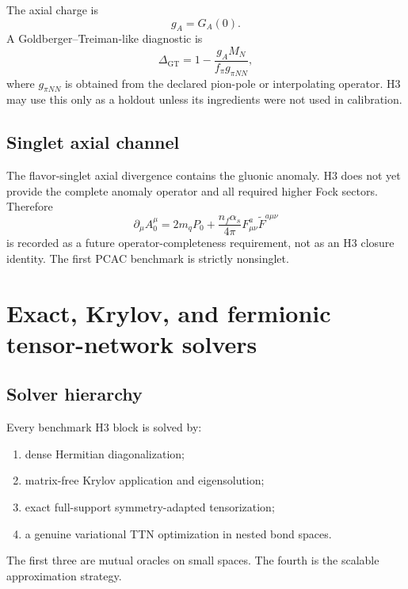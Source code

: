 \documentclass[11pt]{article}
\begin{document}
The axial charge is
\begin{equation}
 g_A=G_A(0).
\end{equation}
A Goldberger--Treiman-like diagnostic is
\cite{GoldbergerTreiman1958}
\begin{equation}
 \Delta_{\mathrm{GT}}
 =1-
 \frac{g_A M_N}{f_{\pi}g_{\pi NN}},
 \label{eq:gt-discrepancy}
\end{equation}
where \(g_{\pi NN}\) is obtained from the declared pion-pole or interpolating
operator.  H3 may use this only as a holdout unless its ingredients were not
used in calibration.

\subsection{Singlet axial channel}

The flavor-singlet axial divergence contains the gluonic anomaly.  H3 does
not yet provide the complete anomaly operator and all required higher Fock
sectors.  Therefore
\begin{equation}
 \partial_{\mu}A_0^{\mu}
 =2m_qP_0+\frac{n_f\alpha_s}{4\pi}F^a_{\mu\nu}\widetilde F^{a\mu\nu}
\end{equation}
is recorded as a future operator-completeness requirement, not as an H3
closure identity.  The first PCAC benchmark is strictly nonsinglet.

\section{Exact, Krylov, and fermionic tensor-network solvers}
\label{sec:solvers}

\subsection{Solver hierarchy}

Every benchmark H3 block is solved by:
\begin{enumerate}
 \item dense Hermitian diagonalization;
 \item matrix-free Krylov application and eigensolution;
 \item exact full-support symmetry-adapted tensorization;
 \item a genuine variational TTN optimization in nested bond spaces.
\end{enumerate}
The first three are mutual oracles on small spaces.  The fourth is the
scalable approximation strategy.
\end{document}
